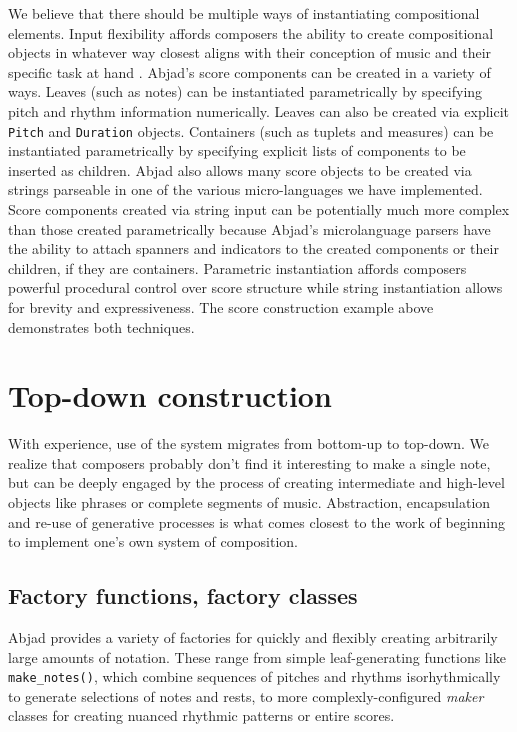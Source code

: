 \documentclass{article}
\begin{document}
We believe that there should be multiple ways of instantiating compositional
elements. Input flexibility affords composers the ability to create
compositional objects in whatever way closest aligns with their conception of
music and their specific task at hand \cite{Kay:1996vn}. Abjad's score
components can be created in a variety of ways. Leaves (such as notes) can be
instantiated parametrically by specifying pitch and rhythm information
numerically. Leaves can also be created via explicit \texttt{Pitch} and
\texttt{Duration} objects. Containers (such as tuplets and measures) can be
instantiated parametrically by specifying explicit lists of components to be
inserted as children. Abjad also allows many score objects to be created via
strings parseable in one of the various micro-languages we have implemented.
Score components created via string input can be potentially much more complex
than those created parametrically because Abjad's microlanguage parsers have
the ability to attach spanners and indicators to the created components or
their children, if they are containers. Parametric instantiation affords
composers powerful procedural control over score structure while string
instantiation allows for brevity and expressiveness. The score construction
example above demonstrates both techniques.

\section{Top-down construction} \label{sec:top-down}

With experience, use of the system migrates from bottom-up to top-down. We
realize that composers probably don't find it interesting to make a single
note, but can be deeply engaged by the process of creating intermediate and
high-level objects like phrases or complete segments of music. Abstraction,
encapsulation and re-use of generative processes is what comes closest to the
work of beginning to implement one's own system of composition.

\subsection{Factory functions, factory classes}

Abjad provides a variety of factories for quickly and flexibly creating
arbitrarily large amounts of notation. These range from simple leaf-generating
functions like \texttt{make\_notes()}, which
combine sequences of pitches and rhythms isorhythmically to generate selections
of notes and rests, to more complexly-configured \emph{maker} classes for
creating nuanced rhythmic patterns or entire scores.
\end{document}
